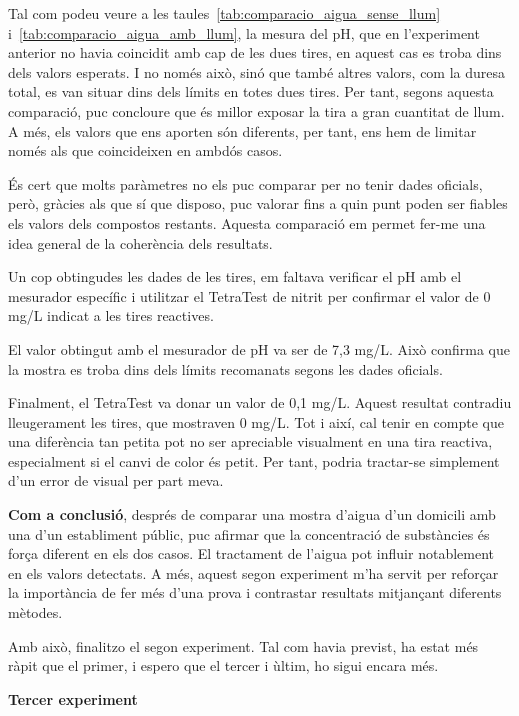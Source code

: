 Tal com podeu veure a les taules~\ref{tab:comparacio_aigua_sense_llum} i~\ref{tab:comparacio_aigua_amb_llum}, la mesura del pH, que en l’experiment anterior no havia coincidit amb cap de les dues tires, en aquest cas es troba dins dels valors esperats. I no només això, sinó que també altres valors, com la duresa total, es van situar dins dels límits en totes dues tires. Per tant, segons aquesta comparació, puc concloure que és millor exposar la tira a gran cuantitat de llum. A més, els valors que ens aporten són diferents, per tant, ens hem de limitar només als que coincideixen en ambdós casos.

És cert que molts paràmetres no els puc comparar per no tenir dades oficials, però, gràcies als que sí que disposo, puc valorar fins a quin punt poden ser fiables els valors dels compostos restants. Aquesta comparació em permet fer-me una idea general de la coherència dels resultats.

Un cop obtingudes les dades de les tires, em faltava verificar el pH amb el mesurador específic i utilitzar el TetraTest de nitrit per confirmar el valor de 0 mg/L indicat a les tires reactives.

El valor obtingut amb el mesurador de pH va ser de 7,3 mg/L. Això confirma que la mostra es troba dins dels límits recomanats segons les dades oficials.

Finalment, el TetraTest va donar un valor de 0,1 mg/L. Aquest resultat contradiu lleugerament les tires, que mostraven 0 mg/L. Tot i així, cal tenir en compte que una diferència tan petita pot no ser apreciable visualment en una tira reactiva, especialment si el canvi de color és petit. Per tant, podria tractar-se simplement d’un error de visual per part meva.

\textbf{Com a conclusió}, després de comparar una mostra d’aigua d’un domicili amb una d’un establiment públic, puc afirmar que la concentració de substàncies és força diferent en els dos casos. El tractament de l’aigua pot influir notablement en els valors detectats. A més, aquest segon experiment m’ha servit per reforçar la importància de fer més d’una prova i contrastar resultats mitjançant diferents mètodes.

Amb això, finalitzo el segon experiment. Tal com havia previst, ha estat més ràpit que el primer, i espero que el tercer i ùltim, ho sigui encara més.
\vspace{10cm}

{\Large \textbf{Tercer experiment}}
\newline

